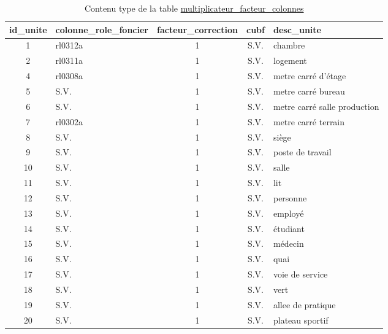         \begin{table}[h]
        \centering
            \begin{tabular}{c l c c p{3cm}}
                \hline
                id\_unite & colonne\_role\_foncier & facteur\_correction & cubf & desc\_unite \\ \hline
                1 & rl0312a & 1 & S.V. & chambre\\
                2 & rl0311a & 1 & S.V. & logement \\
                4 & rl0308a & 1 & S.V. & metre carré d'étage\\
                5 & S.V. & 1 & S.V. & metre carré bureau\\
                \rowcolor{red}6 & S.V. & 1 & S.V. & metre carré salle production \\
                \rowcolor{red}7 & rl0302a & 1 & S.V. & metre carré terrain\\
                \rowcolor{red}8 & S.V. & 1 & S.V. & siège \\
                \rowcolor{red}9 & S.V. & 1 & S.V. & poste de travail \\
                \rowcolor{red}10 &S.V. & 1 & S.V. & salle \\
                \rowcolor{red}11 & S.V. & 1 & S.V. & lit \\
                \rowcolor{red}12 & S.V. & 1 & S.V. & personne \\
                \rowcolor{red}13 & S.V. & 1 & S.V. & employé \\
                \rowcolor{red}14 & S.V. & 1 & S.V. & étudiant \\
                \rowcolor{red}15 & S.V. & 1 & S.V. & médecin \\
                \rowcolor{red}16 & S.V. & 1 & S.V. & quai \\
                \rowcolor{red}17 & S.V. & 1 & S.V. & voie de service \\
                \rowcolor{red}18 & S.V. & 1 & S.V. & vert \\
                \rowcolor{red}19 & S.V. & 1 & S.V. & allee de pratique \\
                \rowcolor{red}20 & S.V. & 1 & S.V. & plateau sportif \\ \hline
            \end{tabular}
            \caption{Contenu type de la table \underline{multiplicateur\_facteur\_colonnes}}\label{tab:unite_pertinentes_minimum_stat}
        \end{table}

